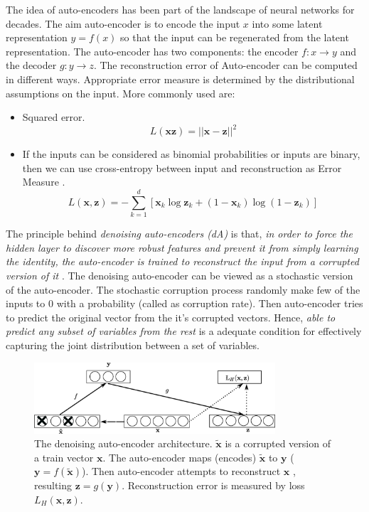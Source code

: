 The idea of auto-encoders has been part of the landscape of neural networks for decades. The aim auto-encoder is to encode the input $x$ into some latent representation $y = f(x)$ so that the input can be regenerated from the latent representation. The auto-encoder has two components: the encoder $f:x \rightarrow y$ and the decoder $g:y\rightarrow z$. The reconstruction error of Auto-encoder can be computed in different ways.  Appropriate error measure is determined by the distributional assumptions on the input. More commonly used are:
\begin{itemize}
\item Squared error.
$$ L(\mathbf{x} \mathbf{z}) = || \mathbf{x} - \mathbf{z} ||^2$$
\item If the inputs can be considered as binomial probabilities or inputs are binary, then we can use cross-entropy between input and reconstruction as Error Measure .
$$L(\mathbf{x}, \mathbf{z}) = - \sum^d_{k=1}[\mathbf{x}_k \log \mathbf{z}_k + (1 - \mathbf{x}_k)\log(1 - \mathbf{z}_k)]$$
\end{itemize}

The principle behind \emph{denoising auto-encoders (dA)} is that, \textit{in order to force the hidden layer to discover more robust features and prevent it from simply learning the identity, the auto-encoder is trained to reconstruct the input from a corrupted version of it} \cite{vincent2008extracting}. The denoising auto-encoder can be viewed as a stochastic version of the auto-encoder. The stochastic corruption process randomly make few of the inputs  to $0$ with a probability (called as corruption rate). Then auto-encoder tries to predict the original vector from the it's corrupted vectors. Hence, \textit{able to predict any subset of variables from the rest} is a adequate condition for effectively capturing the joint distribution between a set of variables.

\begin{figure}[ht]
\centering
\includegraphics[width=0.8\textwidth]{./imgs/sda.eps}
\caption[The denoising auto-encoder architecture]{The denoising auto-encoder architecture. $\mathbf{\tilde{x}}$ is a corrupted version of  a train vector $\mathbf{x}$. The auto-encoder maps (encodes) $\mathbf{\tilde{x}}$ to $\mathbf{y}$ ($\mathbf{y} = f(\mathbf{\tilde{x}})$). Then auto-encoder attempts to reconstruct $\mathbf{x}$ , resulting $ \mathbf{z} = g(\mathbf{y}) $. Reconstruction error is measured by loss $L_{H}(\mathbf{x},\mathbf{z})$. }
\label{fig:sdaChain}
\end{figure}

